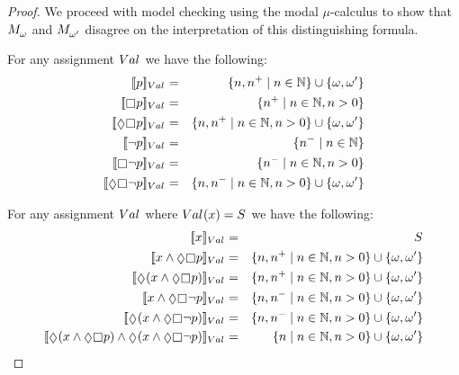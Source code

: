 \begin{proof}
We proceed with model checking using the modal $\mu$-calculus to show that $\kPModel{\omega}$ and $\kPModel{\omega'}$ disagree on the interpretation of this distinguishing formula.

For any assignment $\kAssignment$ we have the following:
\begin{eqnarray*}
    \interpretation[\kAssignment]{\atomP} &=& \{n, n^+ \mid n \in \naturals\} \cup \{\omega, \omega'\}\\
    \interpretation[\kAssignment]{\necessary \atomP} &=& \{n^+ \mid n \in \naturals, n > 0\}\\
    \interpretation[\kAssignment]{\possible \necessary \atomP} &=& \{n, n^+ \mid n \in \naturals, n > 0\} \cup \{\omega, \omega'\}\\
    \interpretation[\kAssignment]{\neg \atomP} &=& \{n^- \mid n \in \naturals\}\\
    \interpretation[\kAssignment]{\necessary \neg \atomP} &=& \{n^- \mid n \in \naturals, n > 0\}\\
    \interpretation[\kAssignment]{\possible \necessary \neg \atomP} &=& \{n, n^- \mid n \in \naturals, n > 0\} \cup \{\omega, \omega'\}
\end{eqnarray*}

For any assignment $\kAssignment$ where $\kAssignment(\varX) = \kStates$ we have the following:
\begin{eqnarray*}
    \interpretation[\kAssignment]{\varX} &=& \kStates\\
    \interpretation[\kAssignment]{\varX \land \possible \necessary \atomP} &=& \{n, n^+ \mid n \in \naturals, n > 0\} \cup \{\omega, \omega'\}\\
    \interpretation[\kAssignment]{\possible (\varX \land \possible \necessary \atomP)} &=& \{n, n^+ \mid n \in \naturals, n > 0\} \cup \{\omega, \omega'\}\\
    \interpretation[\kAssignment]{\varX \land \possible \necessary \neg \atomP} &=& \{n, n^- \mid n \in \naturals, n > 0\} \cup \{\omega, \omega'\}\\
    \interpretation[\kAssignment]{\possible (\varX \land \possible \necessary \neg \atomP)} &=& \{n, n^- \mid n \in \naturals, n > 0\} \cup \{\omega, \omega'\}\\
    \interpretation[\kAssignment]{\possible (\varX \land \possible \necessary \atomP) \land \possible (\varX \land \possible \necessary \neg \atomP)} &=& \{n \mid n \in \naturals, n > 0\} \cup \{\omega, \omega'\}
\end{eqnarray*}


\end{proof}
